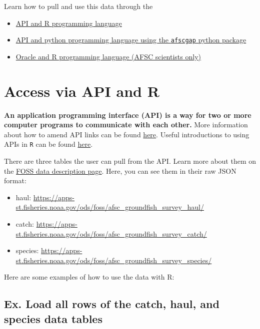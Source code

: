 \documentclass[
  letterpaper,
  oneside,
  open=any]{scrbook}
\providecommand{\tightlist}{%
  \setlength{\itemsep}{0pt}\setlength{\parskip}{0pt}}\usepackage{longtable,booktabs,array}
\begin{document}
Learn how to pull and use this data through the

\begin{itemize}
\tightlist
\item
  \href{https://afsc-gap-products.github.io/gap_products/content/foss-api-r.html}{API
  and R programming language}
\item
  \href{https://afsc-gap-products.github.io/gap_products/content/foss-api-py.html}{API
  and python programming language using the \texttt{afscgap} python
  package}
\item
  \href{https://afsc-gap-products.github.io/gap_products/content/foss-oracle-r.html}{Oracle
  and R programming language (AFSC scientists only)}
\end{itemize}

\chapter{Access via API and R}\label{access-via-api-and-r}

\textbf{An application programming interface (API) is a way for two or
more computer programs to communicate with each other.} More information
about how to amend API links can be found
\href{https://docs.oracle.com/en/database/oracle/oracle-rest-data-services/22.3/books.html\#AELIG90103/}{here}.
Useful introductions to using APIs in \texttt{R} can be found
\href{https://www.dataquest.io/blog/r-api-tutorial/}{here}.

There are three tables the user can pull from the API. Learn more about
them on the
\href{https://afsc-gap-products.github.io/gap_products/content/foss-metadata.html}{FOSS
data description page}. Here, you can see them in their raw JSON format:

\begin{itemize}
\tightlist
\item
  haul:
  \url{https://apps-st.fisheries.noaa.gov/ods/foss/afsc_groundfish_survey_haul/}
\item
  catch:
  \url{https://apps-st.fisheries.noaa.gov/ods/foss/afsc_groundfish_survey_catch/}
\item
  species:
  \url{https://apps-st.fisheries.noaa.gov/ods/foss/afsc_groundfish_survey_species/}
\end{itemize}

Here are some examples of how to use the data with R:

\section{Ex. Load all rows of the catch, haul, and species data
tables}\label{ex.-load-all-rows-of-the-catch-haul-and-species-data-tables}
\end{document}
